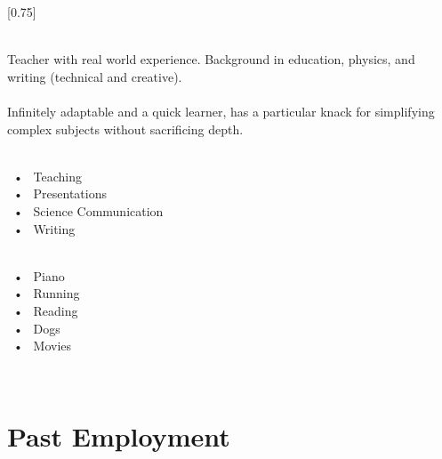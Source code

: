 \documentclass[lighthipster]{simplehipstercv}
\begin{document}
\setlength{\columnsep}{1.5cm}
[0.75]
\begin{paracol}{2}

\paracolbackgroundoptions



\footnotesize
{\setasidefontcolour
\begin{center}
\end{center}
\bigskip
\bigskip
{}\\[0.5em]

Teacher with real world experience. Background in education, physics, and
writing (technical and creative).\\\\Infinitely adaptable and a quick learner,
has a particular knack for simplifying complex subjects without sacrificing
depth.

\bigskip

 \\[0.5em]
~•~ Teaching\\~•~ Presentations\\~•~ Science Communication\\~•~ Writing

\bigskip

\\[0.5em]
~•~ Piano\\~•~ Running\\~•~ Reading \\~•~ Dogs\\~•~ Movies

\vspace{4em}

\\


\phantom{turn the page}

\phantom{turn the page}
}
\switchcolumn

\small
\section*{Past Employment}


\end{paracol}
\end{document}

